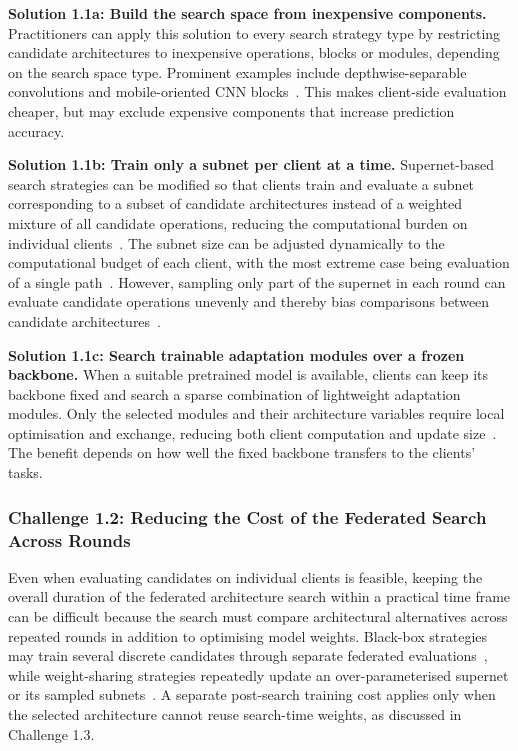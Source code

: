\noindent\textbf{Solution 1.1a: Build the search space from inexpensive components.} Practitioners can apply this solution to every search strategy type by restricting candidate architectures to inexpensive operations, blocks or modules, depending on the search space type. Prominent examples include depthwise-separable convolutions and mobile-oriented CNN blocks~\cite{fed_auto_mri_2023,intrusion_detection_fednas_2024}. This makes client-side evaluation cheaper, but may exclude expensive components that increase prediction accuracy.

\noindent\textbf{Solution 1.1b: Train only a subnet per client at a time.} Supernet-based search strategies can be modified so that clients train and evaluate a subnet corresponding to a subset of candidate architectures instead of a weighted mixture of all candidate operations, reducing the computational burden on individual clients~\cite{dfnas_2020}. The subnet size can be adjusted dynamically to the computational budget of each client, with the most extreme case being evaluation of a single path~\cite{fedoras_2022,divide-and-conquer_fednas_2023,optimize_fednas_edge_2021,efnas_2024,load_monitoring_fednas_2025}. However, sampling only part of the supernet in each round can evaluate candidate operations unevenly and thereby bias comparisons between candidate architectures~\cite{fedoras_2022,hapfnas_2025}.

\noindent\textbf{Solution 1.1c: Search trainable adaptation modules over a frozen backbone.} When a suitable pretrained model is available, clients can keep its backbone fixed and search a sparse combination of lightweight adaptation modules. Only the selected modules and their architecture variables require local optimisation and exchange, reducing both client computation and update size~\cite{fednaspet_2023}. The benefit depends on how well the fixed backbone transfers to the clients' tasks.

\subsubsection{Challenge 1.2: Reducing the Cost of the Federated Search Across Rounds}

Even when evaluating candidates on individual clients is feasible, keeping the overall duration of the federated architecture search within a practical time frame can be difficult because the search must compare architectural alternatives across repeated rounds in addition to optimising model weights. Black-box strategies may train several discrete candidates through separate federated evaluations~\cite{decnas_2022,rt_fed_evo_nas_2020}, while weight-sharing strategies repeatedly update an over-parameterised supernet or its sampled subnets~\cite{fednas_2021,superfednas_2024}. A separate post-search training cost applies only when the selected architecture cannot reuse search-time weights, as discussed in Challenge 1.3.

